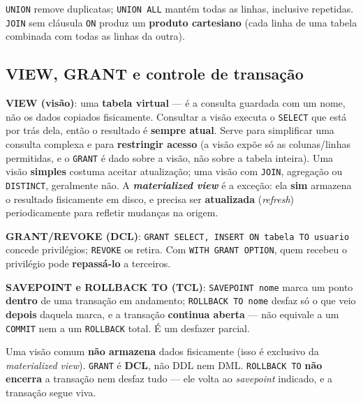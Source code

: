 \begin{cuidado}
\texttt{UNION} remove duplicatas; \texttt{UNION ALL} mantém todas as
linhas, inclusive repetidas. \texttt{JOIN} sem cláusula \texttt{ON}
produz um \textbf{produto cartesiano} (cada linha de uma tabela combinada
com todas as linhas da outra).
\end{cuidado}

\subsection{VIEW, GRANT e controle de transação}

\begin{conceito}
\textbf{VIEW (visão)}: uma \textbf{tabela virtual} --- é a consulta
guardada com um nome, não os dados copiados fisicamente. Consultar a
visão executa o \texttt{SELECT} que está por trás dela, então o resultado
é \textbf{sempre atual}. Serve para simplificar uma consulta complexa e
para \textbf{restringir acesso} (a visão expõe só as colunas/linhas
permitidas, e o \texttt{GRANT} é dado sobre a visão, não sobre a tabela
inteira). Uma visão \textbf{simples} costuma aceitar atualização; uma
visão com \texttt{JOIN}, agregação ou \texttt{DISTINCT}, geralmente não. A
\textbf{\textit{materialized view}} é a exceção: ela \textbf{sim}
armazena o resultado fisicamente em disco, e precisa ser
\textbf{atualizada} (\textit{refresh}) periodicamente para refletir
mudanças na origem.

\textbf{GRANT/REVOKE (DCL)}: \texttt{GRANT SELECT, INSERT ON tabela TO
usuario} concede privilégios; \texttt{REVOKE} os retira. Com
\texttt{WITH GRANT OPTION}, quem recebeu o privilégio pode
\textbf{repassá-lo} a terceiros.

\textbf{SAVEPOINT e ROLLBACK TO (TCL)}: \texttt{SAVEPOINT nome} marca um
ponto \textbf{dentro} de uma transação em andamento; \texttt{ROLLBACK TO
nome} desfaz só o que veio \textbf{depois} daquela marca, e a transação
\textbf{continua aberta} --- não equivale a um \texttt{COMMIT} nem a um
\texttt{ROLLBACK} total. É um desfazer parcial.
\end{conceito}

\begin{cuidado}
Uma visão comum \textbf{não armazena} dados fisicamente (isso é exclusivo
da \textit{materialized view}). \texttt{GRANT} é \textbf{DCL}, não DDL
nem DML. \texttt{ROLLBACK TO} \textbf{não encerra} a transação nem desfaz
tudo --- ele volta ao \textit{savepoint} indicado, e a transação segue
viva.
\end{cuidado}

